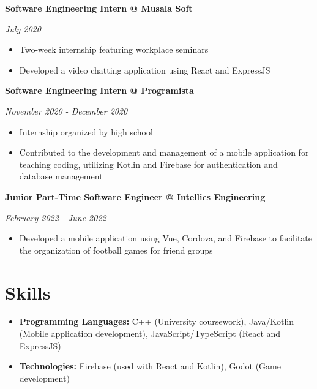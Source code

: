 \documentclass[a4paper,10pt]{article}
\begin{document}
\textbf{Software Engineering Intern @ Musala Soft}

\textit{July 2020}
\begin{itemize}
    \item Two-week internship featuring workplace seminars
    \item Developed a video chatting application using React and ExpressJS
\end{itemize}

\textbf{Software Engineering Intern @ Programista}

\textit{November 2020 - December 2020}
\begin{itemize}
    \item Internship organized by high school
    \item Contributed to the development and management of a mobile application for teaching coding, utilizing Kotlin and Firebase for authentication and database management
\end{itemize}

\textbf{Junior Part-Time Software Engineer @ Intellics Engineering}

\textit{February 2022 - June 2022}
\begin{itemize}
    \item Developed a mobile application using Vue, Cordova, and Firebase to facilitate the organization of football games for friend groups
\end{itemize}

\section*{Skills}

\begin{itemize}
    \item \textbf{Programming Languages:} C++ (University coursework), Java/Kotlin (Mobile application development), JavaScript/TypeScript (React and ExpressJS)
    \item \textbf{Technologies:} Firebase (used with React and Kotlin), Godot (Game development)
\end{itemize}
\end{document}
